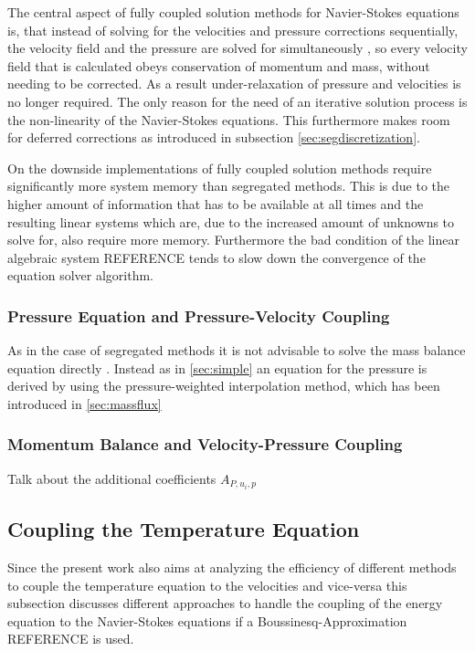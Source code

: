 The central aspect of fully coupled solution methods for Navier-Stokes equations is, that instead of solving for the velocities and pressure corrections sequentially, the velocity field and the pressure are solved for simultaneously \cite{schäfer99}, so every velocity field that is calculated obeys conservation of momentum and mass, without needing to be corrected. As a result under-relaxation of pressure and velocities is no longer required. The only reason for the need of an iterative solution process is the non-linearity of the Navier-Stokes equations. This furthermore makes room for deferred corrections as introduced in subsection \ref{sec:segdiscretization}.

On the downside implementations of fully coupled solution methods require significantly more system memory than segregated methods. This is due to the higher amount of information that has to be available at all times and the resulting linear systems which are, due to the increased amount of unknowns to solve for, also require more memory. Furthermore the bad condition of the linear algebraic system REFERENCE tends to slow down the convergence of the equation solver algorithm. 

\subsubsection{Pressure Equation and Pressure-Velocity Coupling}

As in the case of segregated methods it is not advisable to solve the mass balance equation directly \cite{schaefer99}. Instead as in \ref{sec:simple} an equation for the pressure is derived by using the pressure-weighted interpolation method, which has been introduced in \ref{sec:massflux}

\subsubsection{Momentum Balance and Velocity-Pressure Coupling}

Talk about the additional coefficients \(A_{P,u_i,p}\)

\subsection{Coupling the Temperature Equation}

Since the present work also aims at analyzing the efficiency of different methods to couple the temperature equation to the velocities and vice-versa this subsection discusses different approaches to handle the coupling of the energy equation to the Navier-Stokes equations if a Boussinesq-Approximation REFERENCE is used.
      
